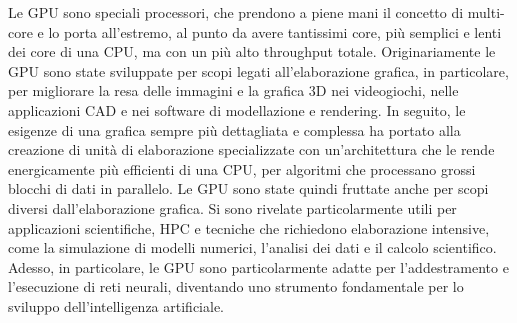 
Le \gls{GPU} sono speciali processori, che prendono a piene mani il concetto di multi-core e lo porta all'estremo, al punto da avere tantissimi core, più semplici e lenti dei core di una CPU, ma con un più alto throughput totale. 
Originariamente le GPU sono state sviluppate per scopi legati all'elaborazione grafica, in particolare, per migliorare la resa delle immagini e la grafica 3D nei videogiochi, nelle applicazioni \gls{CAD} e nei software di modellazione e rendering. In seguito, le esigenze di una grafica sempre più dettagliata e complessa ha portato alla creazione di unità di elaborazione specializzate con un'architettura che le rende energicamente più efficienti di una CPU, per algoritmi che processano grossi blocchi di dati in parallelo. Le GPU sono state quindi fruttate anche per scopi diversi dall'elaborazione grafica. Si sono rivelate particolarmente utili per applicazioni scientifiche, \gls{HPC} e tecniche che richiedono elaborazione intensive, come la simulazione di modelli numerici, l'analisi dei dati e il calcolo scientifico. Adesso, in particolare, le GPU sono particolarmente adatte per l'addestramento e l'esecuzione di reti neurali, diventando uno strumento fondamentale per lo sviluppo dell'intelligenza artificiale.


